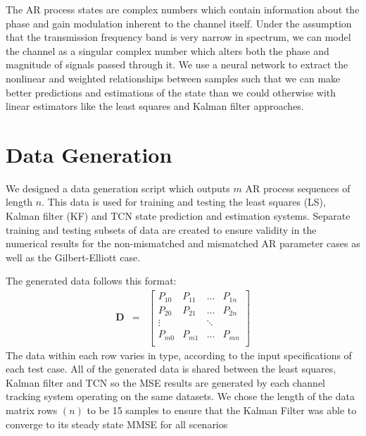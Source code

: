 \documentclass[twocolumn,letterpaper]{IEEEAerospaceCLS}  %
\begin{document}
The AR process states are complex numbers which contain information about the phase and gain modulation inherent to the channel itself. Under the assumption that the transmission frequency band is very narrow in spectrum, we can model the channel as a singular complex number which alters both the phase and magnitude of signals passed through it. We use a neural network to extract the nonlinear and weighted relationships between samples such that we can make better predictions and estimations of the state than we could otherwise with linear estimators like the least squares and Kalman filter approaches. 


\section{Data Generation}

\label{sec:dgen}

We designed a data generation script which 
outputs %
$m$ AR process sequences of length $n$. This data is used for training and testing the least squares (LS), Kalman filter (KF) and TCN state prediction and estimation systems. Separate training and testing subsets of data are created to ensure validity in the numerical results for the non-mismatched and mismatched AR parameter cases as well as the Gilbert-Elliott case.

The generated data follows this format:
\begin{eqnarray*}
\textbf{D}&=&\begin{bmatrix} 
P_{10} & P_{11} & ... & P_{1n} \\
P_{20} & P_{21} & ... & P_{2n} \\
\vdots &  & \ddots &  \\
P_{m0} & P_{m1} & ... & P_{mn} \\
\end{bmatrix}
\end{eqnarray*}
The data within each row varies in type, according to the input specifications of each test case. All of the generated data is shared between the least squares, Kalman filter and TCN so the MSE results are generated by each channel tracking system operating on the same datasets. We chose the length of the data matrix rows $(n)$ to be 15 samples 
to ensure that the Kalman Filter was able to converge to its steady state MMSE for all scenarios
 
\end{document}
